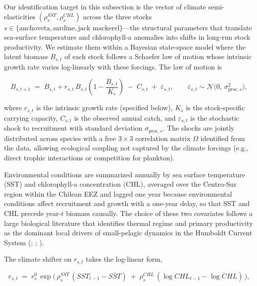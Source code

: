 \documentclass[
  11pt,
]{article}
\begin{document}
Our identification target in this subsection is the vector of climate semi-elasticities \((\rho^{SST}_s, \rho^{CHL}_s)\) across the three stocks \(s \in \{\text{anchoveta}, \text{sardine}, \text{jack mackerel}\}\)---the structural parameters that translate sea-surface temperature and chlorophyll-a anomalies into shifts in long-run stock productivity. We estimate them within a Bayesian state-space model where the latent biomass \(B_{s,t}\) of each stock follows a Schaefer law of motion whose intrinsic growth rate varies log-linearly with these forcings. The law of motion is

\begin{equation}
B_{s,t+1} \;=\; B_{s,t} + r_{s,t}\, B_{s,t}\!\left(1 - \frac{B_{s,t}}{K_s}\right) \;-\; C_{s,t} \;+\; \varepsilon_{s,t}, \qquad \varepsilon_{s,t} \sim \mathcal{N}\!\big(0,\, \sigma_{\text{proc},s}^2\big), \label{eq:law-of-motion}
\end{equation}

where \(r_{s,t}\) is the intrinsic growth rate (specified below), \(K_s\) is the stock-specific carrying capacity, \(C_{s,t}\) is the observed annual catch, and \(\varepsilon_{s,t}\) is the stochastic shock to recruitment with standard deviation \(\sigma_{\text{proc},s}\). The shocks are jointly distributed across species with a free \(3\times 3\) correlation matrix \(\Omega\) identified from the data, allowing ecological coupling not captured by the climate forcings (e.g., direct trophic interactions or competition for plankton).

Environmental conditions are summarized annually by sea surface temperature (SST) and chlorophyll-a concentration (CHL), averaged over the Centro-Sur region within the Chilean EEZ and lagged one year because environmental conditions affect recruitment and growth with a one-year delay, so that SST and CHL precede year-\(t\) biomass causally. The choice of these two covariates follows a large biological literature that identifies thermal regime and primary productivity as the dominant local drivers of small-pelagic dynamics in the Humboldt Current System (; ; ).

The climate shifter on \(r_{s,t}\) takes the log-linear form,

\begin{equation}
r_{s,t} \;=\; r_s^{0}\, \exp\!\Big(\, \rho_s^{SST}\, (SST_{t-1} - \overline{SST}) \;+\; \rho_s^{CHL}\, (\log CHL_{t-1} - \overline{\log CHL}) \,\Big), \label{eq:shifter}
\end{equation}
\end{document}
